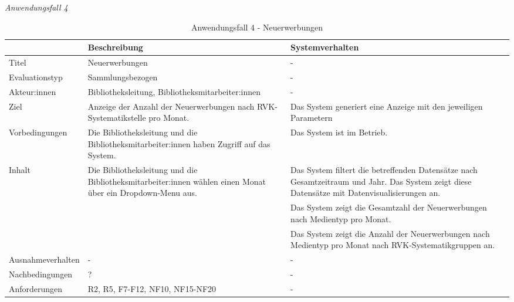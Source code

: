 \newpage
\noindent
\textit{Anwendungsfall 4}

\begingroup
\setlength{\tabcolsep}{10pt} %
\renewcommand{\arraystretch}{1.25} 
\begin{table}[h]
    \centering
    \begin{adjustbox}{max width=\textwidth}
    \begin{tabular}{lp{7.0cm}p{7.0cm}}
       \toprule
       \textbf{}          & \textbf{Beschreibung} &\textbf{Systemverhalten}\\
       \midrule
        Titel                            &Neuerwerbungen& -\\
        Evaluationstyp                   &Sammlungsbezogen                   & -\\
        Akteur:innen                     &Bibliotheksleitung, Bibliotheksmitarbeiter:innen& -\\
        Ziel                             &Anzeige der Anzahl der Neuerwerbungen nach RVK-Systematikstelle pro Monat.& Das System generiert eine Anzeige mit den jeweiligen Parametern\\
        Vorbedingungen                   &Die Bibliotheksleitung und die Bibliotheksmitarbeiter:innen haben Zugriff auf das System.& Das System ist im Betrieb.\\
        Inhalt                &Die Bibliotheksleitung und die Bibliotheksmitarbeiter:innen wählen einen Monat über ein Dropdown-Menu aus.& Das System filtert die betreffenden Datensätze nach Gesamtzeitraum und Jahr. Das System zeigt diese Datensätze mit Datenvisualisierungen an.\\
                                         & &Das System zeigt die Gesamtzahl der Neuerwerbungen nach Medientyp pro Monat.\\
                                         & &Das System zeigt die Anzahl der Neuerwerbungen nach Medientyp pro Monat nach RVK-Systematikgruppen an.\\
        Ausnahmeverhalten               &- & -\\
        Nachbedingungen                 &?& -\\

        Anforderungen                   &R2, R5, F7-F12, NF10, NF15-NF20& -\\
        \bottomrule
    \end{tabular}
    \end{adjustbox}
    \caption{%
    Anwendungsfall 4 - Neuerwerbungen    }
    \label{tab:AF_Neuerwerbungen}
    \end{table}
\endgroup


